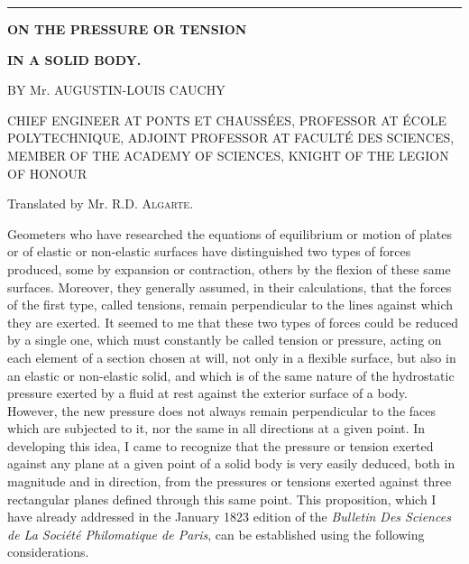 \documentclass[leqno,openright,smallroyalvopaper,8pt,twoside,showtrims]{memoir}
\begin{document}
\vspace*{0.5cm}
\noindent
\rule{\textwidth}{0.5pt}\vspace*{-\baselineskip}\vspace*{2pt} 
\vspace*{.2cm}
\begin{center}
{\LARGE \textbf{ON THE PRESSURE OR TENSION}}\vspace*{3pt} 

{\Large \textbf{IN A SOLID BODY.}}\vspace*{10pt} 

{\large BY Mr. AUGUSTIN-LOUIS CAUCHY} \vspace*{2pt} 

{CHIEF ENGINEER AT PONTS ET CHAUSS\'EES, PROFESSOR AT \'ECOLE POLYTECHNIQUE, ADJOINT PROFESSOR AT FACULT\'E DES SCIENCES, MEMBER OF THE ACADEMY OF SCIENCES, KNIGHT OF THE LEGION OF HONOUR}\vspace*{2pt} 


{\small Translated by Mr. R.D. {\normalfont\scshape Algarte}}.\vspace*{.5cm}

\quad{}\quad{}\vspace*{.5cm}


\end{center}
\normalfont

Geometers who have researched the equations of equilibrium or motion of plates or of elastic or non-elastic surfaces have distinguished two types of forces produced, some by expansion or contraction, others by the flexion of these same surfaces. Moreover, they generally assumed, in their calculations, that the forces of the first type, called tensions, remain perpendicular to the lines against which they are exerted. It seemed to me that these two types of forces could be reduced by a single one, which must constantly be called tension or pressure, acting on each element of a section chosen at will, not only in a flexible surface, but also in an elastic or non-elastic solid, and which is of the same nature of the hydrostatic pressure exerted by a fluid at rest against the exterior surface of a body. However, the new pressure does not always remain perpendicular to the faces which are subjected to it, nor the same in all directions at a given point. In developing this idea, I came to recognize that the pressure or tension exerted against any plane at a given point of a solid body is very easily deduced, both in magnitude and in direction, from the pressures or tensions exerted against three rectangular planes defined through this same point. This proposition, which I have already addressed in the January 1823 edition of the \emph{Bulletin Des Sciences de La Soci\'et\'e Philomatique de Paris}, can be established using the following considerations.
\end{document}
